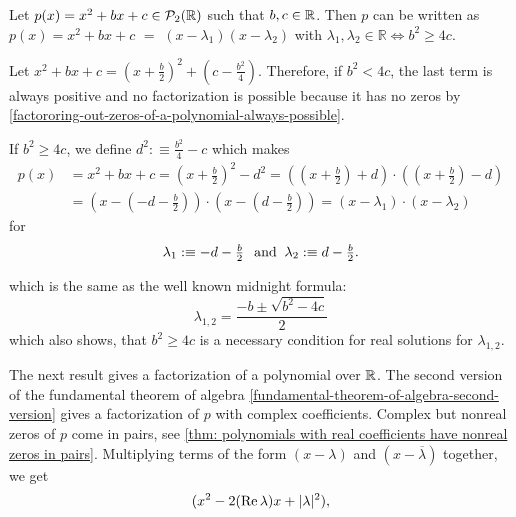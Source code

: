 \begin{thm} 
  \label{thm: factorization of a quadratic polynomial}
  Let $p(x)=x^2+bx+c \in \mathcal{P}_2(\mathbb{R})$ such that $b,c \in \mathbb{R}$. Then $p$ can be written as
  $p(x)=x^2 + bx + c$ $=$ $(x-\lambda_1)(x-\lambda_2)$ with $\lambda_1, \lambda_2 \in \mathbb{R} \iff b^2 \geq 4c$.
\end{thm}
\begin{prf}
  Let $x^2+bx+c=\left(x+\tfrac{b}{2} \right)^2+\left(c-\tfrac{b^2}{4} \right)$. Therefore, if $b^2<4c$, the last term is always positive and no factoriza\-tion is possible because it has no zeros by \ref{factororing-out-zeros-of-a-polynomial-always-possible}.

  If $b^2 \geq 4c$, we define $d^2 :\equiv \tfrac{b^2}{4}-c$ which makes
  \begin{equation}
	  \begin{aligned}
	    p(x)&=x^2+bx+c
		  = \left (x+\tfrac{b}{2} \right )^2-d^2
		  = \left ( \left(x+\tfrac{b}{2} \right) +d \right) \cdot \left ( \left(x+\tfrac{b}{2} \right) - d \right) \\
		  &= \left (x-\left(-d -\tfrac{b}{2} \right) \right) \cdot \left (x-\left(d-\tfrac{b}{2} \right)\right)
		  =\left(x-\lambda_1 \right) \cdot \left(x-\lambda_2\right)
	  \end{aligned}
  \end{equation}
  for
  \begin{equation}
    \lambda_1 :\equiv -d-\tfrac{b}{2} \;\;\, \text{and}\;\; \lambda_2 :\equiv d-\tfrac{b}{2}.
  \end{equation}

  which is the same as the well known midnight formula:
  \begin{equation}
    \lambda_{1,2} = \frac{-b \pm \sqrt{b^2-4c}}{2}
  \end{equation}
  which also shows, that $b^2 \geq 4c$ is a necessary condition for real solutions for $\lambda_{1,2}$.
\end{prf}

The next result gives a factorization of a polynomial over $\mathbb{R}$. The second version of the fundamental theorem of algebra \ref{fundamental-theorem-of-algebra-second-version} gives a factorization of $p$ with complex coefficients. Complex but nonreal zeros of $p$ come in pairs, see \ref{thm: polynomials with real coefficients have nonreal zeros in pairs}. Multiplying terms of the form $(x-\lambda)$ and $(x-\overline{\lambda})$ together, we get
\[
  (x^2 - 2( \operatorname{Re} \lambda) x + |\lambda|^2),
\]

